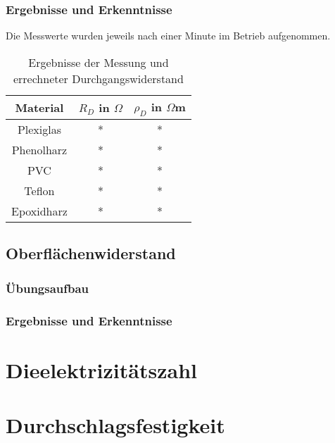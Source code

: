 \documentclass[a4paper,twoside,12pt,DIV=13,BCOR=5mm,numbers=noenddot,cleardoublepage=empty]{scrbook}
\begin{document}
            \subsection{Ergebnisse und Erkenntnisse}
            Die Messwerte wurden jeweils nach einer Minute im Betrieb aufgenommen.
            \begin{table}[h]
                \begin{center}
                    \begin{tabular}{|c||c|c|}
                        \hline
                        Material & $R_D$ in $\Omega$ & $\rho_D$ in $\Omega$m \\
                        \hline
                        \hline
                        Plexiglas & * & * \\
                        \hline
                        Phenolharz & * & * \\
                        \hline
                        PVC & * & * \\
                        \hline
                        Teflon & * & * \\
                        \hline
                        Epoxidharz & * & * \\
                        \hline
                    \end{tabular}
                    \caption{Ergebnisse der Messung und errechneter Durchgangswiderstand}
                    \label{tab:table1}
                \end{center}
            \end{table}
        \section{Oberfl\"achenwiderstand}
            \subsection{\"Ubungsaufbau}
            \subsection{Ergebnisse und Erkenntnisse}
    \chapter{Dieelektrizit\"atszahl}

    \chapter{Durchschlagsfestigkeit}
\end{document}

